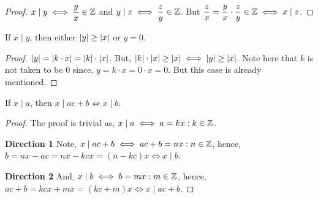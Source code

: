 
\begin{proof}
    \( x \mid y \iff \dfrac{y}{x} \in \mathbb Z \) and \(  y \mid z \iff \dfrac{z}{y} \in \mathbb Z \). But \( \dfrac{z}{x}= \dfrac{y}{x}\cdot\dfrac{z}{y} \in \mathbb Z \iff x\mid z\).
\end{proof}



\begin{theorem}
    If \(x \mid y\), then either \(\abs{y} \ge \abs{x} \) or \(y=0\).
\end{theorem}


\begin{proof}
    \(\abs{y}=\abs{k\cdot x}= \abs{k}\cdot \abs{x}\). But, \( \abs{k}\cdot \abs{x} \ge \abs{x} \iff \abs{y} \ge \abs{x}\). Note here that \(k\) is not taken to be \(0\) since, \(y=k\cdot x=0\cdot x=0\). But this case is already mentioned.
\end{proof}




\begin{lemma}
    \label{lem: unimp}
    If \(x \mid a\), then \(x \mid ac+b \iff x\mid b\).
\end{lemma}

\begin{proof}
    The proof is trivial as, \(x \mid a \iff a = kx : k \in \mathbb Z\).
    \par 
    \textbf{Direction 1}
    Note, \(x \mid ac+b \iff ac+b=nx : n \in \mathbb Z\), hence, \(b=nx-ac=nx-kcx=(n-kc)x \iff x \mid b\).
    \par
    \textbf{Direction 2}
    And, \(x\mid b \iff b=mx : m \in \mathbb Z \), hence, \(ac+b=kcx+mx=(kc+m)x \iff x \mid ac+b \).
\end{proof}

